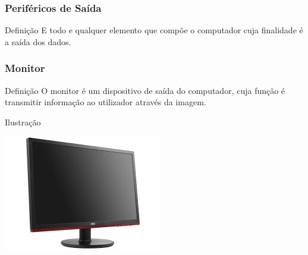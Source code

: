 \documentclass[aspectratio=169]{beamer} %
\begin{document}
\begin{frame}
	\frametitle{Periféricos de Saída}
	
	\begin{block}{Defini\c cão}
		E todo e qualquer elemento que compõe o computador cuja finalidade é a saída dos dados.
	\end{block}
\end{frame}

\begin{frame}
	\frametitle{Monitor}
	
	\begin{block}{Defini\c cão}
		O monitor é um dispositivo de saída do computador, cuja função é transmitir informação ao utilizador através da imagem.
	\end{block}\vfill
	
	\begin{exampleblock}{Ilustra\c cão}
		\begin{center}
			\includegraphics[scale=0.4]{img/monitor}
		\end{center}		
	\end{exampleblock}
\end{frame}
\end{document}
